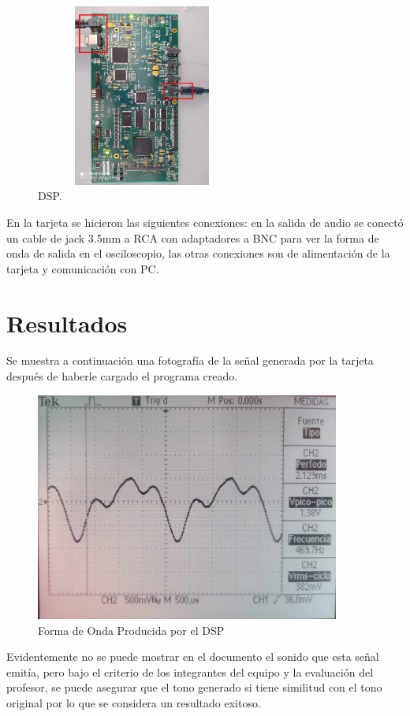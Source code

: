 \documentclass[12pt]{article}
\begin{document}
\begin{figure}[h]
    \centering
        \includegraphics[width=7cm,height=6cm]{tarjeta.jpg}
        \caption{DSP.}
\end{figure}

En la tarjeta se hicieron las siguientes conexiones: en la salida de audio se conectó un cable de jack 3.5mm a RCA con adaptadores a BNC para ver la forma de onda de salida en el osciloscopio, las otras conexiones son de alimentación de la tarjeta y comunicación con PC. 

\section{Resultados}
Se muestra a continuación una fotografía de la señal generada por la tarjeta después de haberle cargado el programa creado.
\begin{figure}[h]
\centering
\includegraphics[width=10cm]{Osciloscopio.jpeg} 
\caption{Forma de Onda Producida por el DSP}
\end{figure}

Evidentemente no se puede mostrar en el documento el sonido que esta señal emitía, pero bajo el criterio de los integrantes del equipo y la evaluación del profesor, se puede asegurar que el tono generado si tiene similitud con el tono original por lo que se considera un resultado exitoso.
\end{document}
